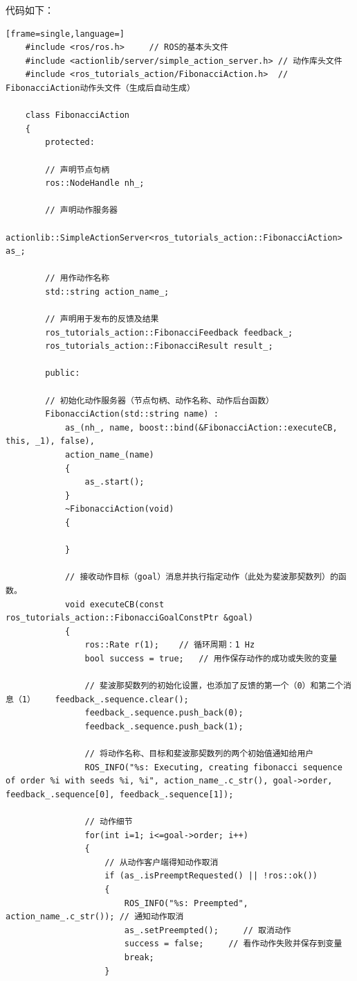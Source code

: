 \documentclass[geye,green,kindle,cn]{elegantnote}
\begin{document}
代码如下：
\begin{lstlisting}[frame=single,language=]
    #include <ros/ros.h>     // ROS的基本头文件 
    #include <actionlib/server/simple_action_server.h> // 动作库头文件 
    #include <ros_tutorials_action/FibonacciAction.h>  // FibonacciAction动作头文件（生成后自动生成） 
    
    class FibonacciAction 
    { 
        protected:  
        
        // 声明节点句柄  
        ros::NodeHandle nh_;  
        
        // 声明动作服务器  
        actionlib::SimpleActionServer<ros_tutorials_action::FibonacciAction> as_;  
        
        // 用作动作名称  
        std::string action_name_;  
        
        // 声明用于发布的反馈及结果  
        ros_tutorials_action::FibonacciFeedback feedback_;  
        ros_tutorials_action::FibonacciResult result_; 
        
        public:  
        
        // 初始化动作服务器（节点句柄、动作名称、动作后台函数）  
        FibonacciAction(std::string name) :    
            as_(nh_, name, boost::bind(&FibonacciAction::executeCB, this, _1), false),    
            action_name_(name)  
            {    
                as_.start();  
            }  
            ~FibonacciAction(void)  
            {

            }  
        
            // 接收动作目标（goal）消息并执行指定动作（此处为斐波那契数列）的函数。  
            void executeCB(const ros_tutorials_action::FibonacciGoalConstPtr &goal) 
            {    
                ros::Rate r(1);    // 循环周期：1 Hz    
                bool success = true;   // 用作保存动作的成功或失败的变量    
                
                // 斐波那契数列的初始化设置，也添加了反馈的第一个（0）和第二个消息（1）    feedback_.sequence.clear();    
                feedback_.sequence.push_back(0);    
                feedback_.sequence.push_back(1);    
                
                // 将动作名称、目标和斐波那契数列的两个初始值通知给用户    
                ROS_INFO("%s: Executing, creating fibonacci sequence of order %i with seeds %i, %i", action_name_.c_str(), goal->order, feedback_.sequence[0], feedback_.sequence[1]);    
                
                // 动作细节    
                for(int i=1; i<=goal->order; i++)    
                {      
                    // 从动作客户端得知动作取消      
                    if (as_.isPreemptRequested() || !ros::ok())      
                    {        
                        ROS_INFO("%s: Preempted", action_name_.c_str()); // 通知动作取消         
                        as_.setPreempted();     // 取消动作        
                        success = false;     // 看作动作失败并保存到变量        
                        break;      
                    }
                

\end{lstlisting}
\end{document}

